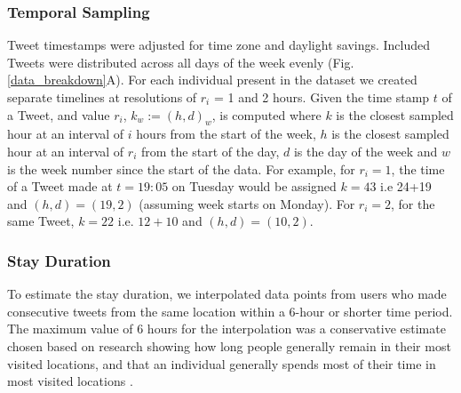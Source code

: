 \subsubsection{Temporal Sampling}
Tweet timestamps were adjusted for time zone and daylight savings. 
Included Tweets were distributed across all days of the week evenly (Fig. \ref{data_breakdown}A). For each individual present in the dataset we created separate timelines at resolutions of $r_i$ = 1 and 2 hours. Given the time stamp $t$ of a Tweet, and value $r_i$, $k_w := (h,d)_w$, is computed where $k$ is the closest sampled hour at an interval of $i$ hours from the start of the week, $h$ is the closest sampled hour at an interval of $r_i$ from the start of the day, $d$ is the day of the week and $w$ is the week number since the start of the data. For example, for $r_i=1$, the time of a Tweet made at $t=19:05$ on Tuesday would be assigned $k=43$ i.e 24+19 and $(h,d)=(19,2)$ (assuming week starts on Monday). For $r_i=2$, for the same Tweet, $k=22$ i.e. $12+10$ and $(h,d)=(10,2)$. 
\subsubsection{Stay Duration}
To estimate the stay duration, we interpolated data points from users who made consecutive tweets from the same location within a 6-hour or shorter time period. The maximum value of 6 hours for the interpolation was a conservative estimate chosen based on research showing how long people generally remain in their most visited locations, and that an individual generally spends most of their time in most visited locations \cite{141,125,142}.   
